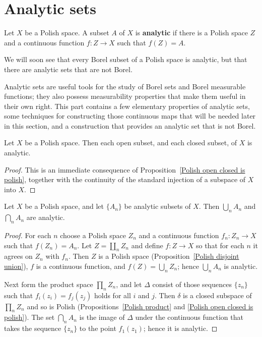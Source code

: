 \section{Analytic sets}
Let $X$ be a Polish space. A subset $A$ of $X$ is \textbf{analytic} if there is a Polish space $Z$ and a continuous function $f:Z\to X$ such that $f(Z)=A$.\par
We will soon see that every Borel subset of a Polish space is analytic, but that there are analytic sets that are not Borel.\par
Analytic sets are useful tools for the study of Borel sets and Borel measurable functions; they also possess measurability properties that make
them useful in their own right. This part contains a few elementary properties of analytic sets, some techniques for constructing those continuous maps that will be needed later in this section, and a construction that provides an analytic set that is not Borel.
\begin{proposition}\label{Polish open closed subset analytic}
Let $X$ be a Polish space. Then each open subset, and each closed subset, of $X$ is analytic.
\end{proposition}
\begin{proof}
This is an immediate consequence of Proposition~\ref{Polish open closed is polish}, together with the continuity of the standard injection of a subspace of $X$ into $X$.
\end{proof}
\begin{proposition}\label{Polish analytic intersect union}
Let $X$ be a Polish space, and let $\{A_n\}$ be analytic subsets of $X$. Then $\bigcup_nA_n$ and $\bigcap_nA_n$ are analytic.
\end{proposition}
\begin{proof}
For each $n$ choose a Polish space $Z_n$ and a continuous function $f_n:Z_n\to X$ such that $f(Z_n)=A_n$. Let $Z=\coprod_nZ_n$ and define $f:Z\to X$ so that for each $n$ it agrees on $Z_n$ with $f_n$. Then $Z$ is a Polish space (Proposition~\ref{Polish disjoint union}), $f$ is a continuous function, and $f(Z)=\bigcup_nZ_n$; hence $\bigcup_nA_n$ is analytic.\par
Next form the product space $\prod_nZ_n$, and let $\Delta$ consist of those sequences $\{z_n\}$ such that $f_i(z_i)=f_j(z_j)$ holds for all $i$ and $j$. Then $\delta$ is a closed subspace of $\prod_nZ_n$ and so is Polish (Propositions~\ref{Polish product} and \ref{Polish open closed is polish}). The set $\bigcap_nA_n$ is the image of $\Delta$ under the continuous function that takes the sequence $\{z_n\}$ to the point $f_1(z_1)$; hence it is analytic.
\end{proof}
